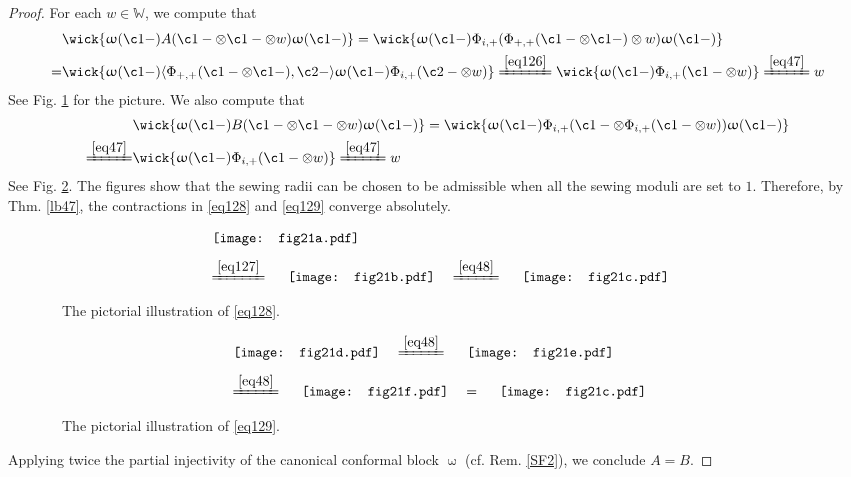 \documentclass[11pt,b5paper,notitlepage]{article}
\theoremstyle{definition}
\theoremstyle{plain}
\newcommand{\Wbb}{\mathbb W}
\newcommand{\<}{\left\langle}
\renewcommand{\>}{\right\rangle}
\numberwithin{equation}{section}
\begin{document}
\begin{proof}
For each $w\in\Wbb$, we compute that
\begin{align}
&\wick{\upomega(\c1 -) A(\c1 -\otimes \c1 -\otimes w)\upomega(\c1 -)}=\wick{\upomega(\c1 -)\Phi_{i,+}(\Phi_{+,+}(\c1 -\otimes \c1 -)\otimes w)\upomega(\c1 -)}\nonumber\\
=&\wick{\upomega(\c1-)\langle\Phi_{+,+}(\c1-\otimes\c1-),\c2-\rangle\upomega(\c1-)\Phi_{i,+}(\c2-\otimes w) }\xlongequal{\eqref{eq126}}\wick{\upomega(\c1 -)\Phi_{i,+}(\c1 -\otimes w)}\xlongequal{\eqref{eq47}}w  \label{eq128}
	\end{align}
See Fig. \ref{img4} for the picture. We also compute that
\begin{align}
&\wick{\upomega(\c1 -) B(\c1 -\otimes \c1 -\otimes w)\upomega(\c1 -)}=\wick{\upomega(\c1 -)\Phi_{i,+}(\c1 -\otimes \Phi_{i,+}(\c1 -\otimes w))\upomega(\c1 -)}\nonumber\\
\xlongequal{\eqref{eq47}}&\wick{\upomega(\c1 -)\Phi_{i,+}(\c1 -\otimes w)}\xlongequal{\eqref{eq47}}w  \label{eq129}
\end{align}
See Fig. \ref{img5}. The figures show that the sewing radii can be chosen to be admissible when all the sewing moduli are set to $1$. Therefore, by Thm. \ref{lb47}, the contractions in \eqref{eq128} and \eqref{eq129} converge absolutely.

\begin{figure}[H]
	\centering
\begin{align*}
&\vcenter{\hbox{{
		   \texttt{[image: fig21a.pdf]}}}}\\[1ex]
&\xlongequal{\eqref{eq127}}\quad
\vcenter{\hbox{{
		   \texttt{[image: fig21b.pdf]}}}}
\quad\xlongequal{\eqref{eq48}}\quad \vcenter{\hbox{{
		   \texttt{[image: fig21c.pdf]}}}}
\end{align*}
\caption{~~The pictorial illustration of \eqref{eq128}.}
	\label{img4}
\end{figure}

\begin{figure}[H]
	\centering
\begin{align*}
&\vcenter{\hbox{{
		   \texttt{[image: fig21d.pdf]}}}}
\quad\xlongequal{\eqref{eq48}}\quad\vcenter{\hbox{{
		   \texttt{[image: fig21e.pdf]}}}}\\[1ex]
&\xlongequal{\eqref{eq48}}\quad
\vcenter{\hbox{{
		   \texttt{[image: fig21f.pdf]}}}}
\quad=\quad \vcenter{\hbox{{
		   \texttt{[image: fig21c.pdf]}}}}
\end{align*}
\caption{~~The pictorial illustration of \eqref{eq129}.}
	\label{img5}
\end{figure}
Applying twice the partial injectivity of the canonical conformal block $\upomega$ (cf. Rem. \ref{SF2}), we conclude $A=B$.
\end{proof}
\end{document}
